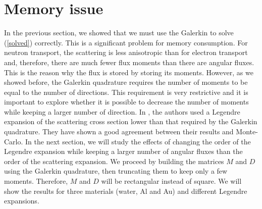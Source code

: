 \section{Memory issue}
In the previous section, we showed that we must use the Galerkin to solve
(\ref{solved}) correctly. This is a significant problem for memory consumption.  
For neutron transport, the scattering is less anisotropic than for electron
transport and, therefore, there are much fewer flux moments than there are angular 
fluxes. This is the reason why the flux is stored by storing its moments. 
However, as we showed before, the Galerkin quadrature requires the number of moments 
to be equal to the number of directions. This requirement is very restrictive and it 
is important to explore whether it is possible to decrease the number of moments 
while keeping a larger number of direction. In \cite{mem}, the authors used a 
Legendre expansion of the scattering cross section lower than that required by the 
Galerkin quadrature. They have shown a good agreement between their results 
and Monte-Carlo. In the next section, we will study the effects of changing 
the order of the Legendre expansion while keeping a larger number of angular 
fluxes than the order of the scattering expansion. We proceed  by building 
the matrices $M$ and $D$ using the Galerkin quadrature, then truncating them 
to keep only a few moments. Therefore, $M$ and $D$ will be rectangular instead 
of square. We will show the results for three materials (water, Al and Au) 
and different Legendre expansions.
